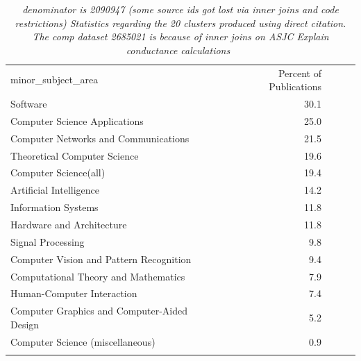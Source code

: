 \begin{table}[ht]
\caption{\emph{denominator is 2090947 (some source ids got lost via inner joins and code restrictions) Statistics regarding the 20 clusters produced using direct citation. The \emph{comp} dataset 
2685021 is because of inner joins on ASJC Explain conductance calculations~\cite{shun_parallel_2016}}}
\label{tab:comp}       
\begin{tabular}{lrccc}
\hline\noalign{\smallskip}
minor\_subject\_area & Percent of Publications \\
\noalign{\smallskip}\hline\noalign{\smallskip}
Software & 30.1 \\
Computer Science Applications & 25.0 \\ 
Computer Networks and Communications & 21.5 \\
Theoretical Computer Science & 19.6 \\ 
Computer Science(all) & 19.4 \\ 
Artificial Intelligence & 14.2 \\ 
Information Systems & 11.8 \\ 
Hardware and Architecture & 11.8 \\ 
Signal Processing & 9.8 \\ 
Computer Vision and Pattern Recognition & 9.4 \\ 
Computational Theory and Mathematics & 7.9 \\ 
Human-Computer Interaction & 7.4 \\ 
Computer Graphics and Computer-Aided Design & 5.2 \\ 
Computer Science (miscellaneous) & 0.9 \\ 
\noalign{\smallskip}\hline
\end{tabular}
\end{table}
\newpage


